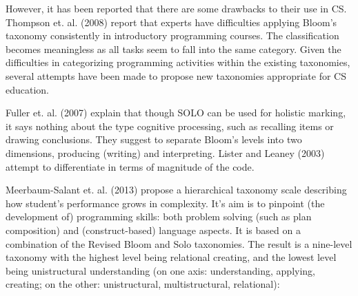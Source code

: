 However, it has been reported that there are some drawbacks to their use in CS. Thompson et. al. (2008) report that experts have difficulties applying Bloom's taxonomy consistently in introductory programming courses. The classification becomes meaningless as all tasks seem to fall into the same category. Given the difficulties in categorizing programming activities within the existing taxonomies, several attempts have been made to propose new taxonomies appropriate for CS education.

 Fuller et. al. (2007) explain that though SOLO can be used for holistic marking, it says nothing about the type cognitive processing, such as recalling items or drawing conclusions. They suggest to separate Bloom’s levels into two dimensions, producing (writing) and interpreting. Lister and Leaney (2003) attempt to differentiate in terms of magnitude of the code.

Meerbaum-Salant et. al. (2013) propose a hierarchical taxonomy scale describing how student’s performance grows in complexity. It’s aim is to pinpoint (the development of) programming skills: both problem solving (such as plan composition) and (construct-based) language aspects. It is based on a combination of the Revised Bloom and Solo taxonomies. The result is a nine-level taxonomy with
the highest level being relational creating, and the lowest level being
unistructural understanding (on one axis: understanding, applying, creating; on the other: unistructural, multistructural, relational):



